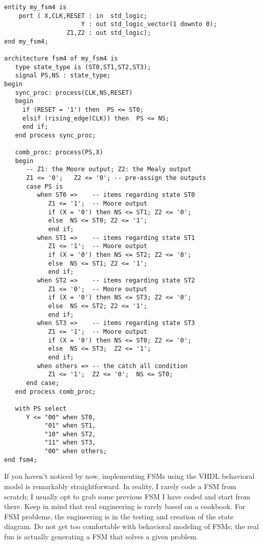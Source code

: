 \newpage\clearpage
\begin{lstlisting}[label=exe_20_code, caption=Solution to Example 20.]
entity my_fsm4 is 
    port ( X,CLK,RESET : in  std_logic; 
                     Y : out std_logic_vector(1 downto 0); 
                 Z1,Z2 : out std_logic);  
end my_fsm4;

architecture fsm4 of my_fsm4 is
   type state_type is (ST0,ST1,ST2,ST3); 
   signal PS,NS : state_type; 
begin
   sync_proc: process(CLK,NS,RESET)
   begin
     if (RESET = '1') then  PS <= ST0; 
     elsif (rising_edge(CLK)) then  PS <= NS; 
     end if; 
   end process sync_proc; 

   comb_proc: process(PS,X)
   begin
      -- Z1: the Moore output; Z2: the Mealy output
      Z1 <= '0';   Z2 <= '0'; -- pre-assign the outputs
      case PS is 
         when ST0 =>    -- items regarding state ST0
            Z1 <= '1';  -- Moore output 
            if (X = '0') then NS <= ST1; Z2 <= '0';   
            else  NS <= ST0; Z2 <= '1';
            end if; 
         when ST1 =>    -- items regarding state ST1
            Z1 <= '1';  -- Moore output 
            if (X = '0') then NS <= ST2; Z2 <= '0';  
            else  NS <= ST1; Z2 <= '1'; 
            end if; 
         when ST2 =>    -- items regarding state ST2
            Z1 <= '0';  -- Moore output 
            if (X = '0') then NS <= ST3; Z2 <= '0'; 
            else  NS <= ST2; Z2 <= '1'; 
            end if; 
         when ST3 =>    -- items regarding state ST3
            Z1 <= '1';  -- Moore output 
            if (X = '0') then NS <= ST0; Z2 <= '0'; 
            else  NS <= ST3;  Z2 <= '1';     
            end if; 
         when others => -- the catch all condition
            Z1 <= '1';  Z2 <= '0';  NS <= ST0; 
      end case; 
   end process comb_proc; 
 
   with PS select
      Y <= "00" when ST0, 
           "01" when ST1, 
           "10" when ST2, 
           "11" when ST3, 
           "00" when others; 
end fsm4;
\end{lstlisting}

If you haven't noticed by now, implementing FSMs using the VHDL behavioral model is remarkably straightforward. In reality, I rarely code a FSM from scratch; I usually opt to grab some previous FSM I have coded and start from there. Keep in mind that real engineering is rarely based on a cookbook. For FSM problems, the engineering is in the testing and creation of the state diagram. Do not get too comfortable with behavioral modeling of FSMs; the real fun is actually generating a FSM that solves a given problem. 

